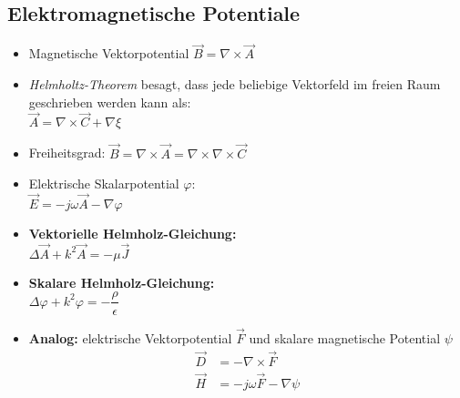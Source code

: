 \subsection{Elektromagnetische Potentiale}
\begin{itemize}
    \itemsep1pt
    \item Magnetische Vektorpotential \(\vec{B} = \nabla\times\vec{A}\)
    \item \textit{Helmholtz-Theorem} besagt, dass jede beliebige Vektorfeld im freien Raum geschrieben werden kann als:\\
        \(\vec{A} = \nabla\times\vec{C} + \nabla\xi\)
    \item Freiheitsgrad: \(\vec{B} = \nabla\times\vec{A} = \nabla\times\nabla\times\vec{C}\)
    \item Elektrische Skalarpotential $\varphi$:\\
        \(\vec{E} = -j\omega\vec{A} - \nabla\varphi\)
    \item \textbf{Vektorielle Helmholz-Gleichung:}\\
        \(\Delta\vec{A} + k^2\vec{A}  = -\mu\vec{J}\)
    \item \textbf{Skalare Helmholz-Gleichung:}\\
        \(\Delta\varphi + k^2\varphi = -\dfrac{\rho}{\epsilon}\)
    \item \textbf{Analog:} elektrische Vektorpotential $\vec{F}$ und skalare magnetische Potential $\psi$
        \begin{align*}
            \vec{D} &= -\nabla \times \vec{F}\\
            \vec{H} &= -j\omega\vec{F} - \nabla\psi
        \end{align*}
\end{itemize}
